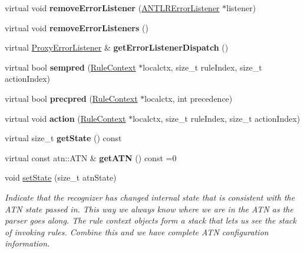 \begin{DoxyCompactItemize}
\mbox{\label{classantlr4_1_1Recognizer_a50b0c2e240269b77423c9a5594099702}} 
virtual void {\bfseries remove\+Error\+Listener} (\hyperlink{classantlr4_1_1ANTLRErrorListener}{A\+N\+T\+L\+R\+Error\+Listener} $\ast$listener)
\item 
\mbox{\label{classantlr4_1_1Recognizer_a797d1a5ae007a3b4cf34ce4cf9cf483d}} 
virtual void {\bfseries remove\+Error\+Listeners} ()
\item 
\mbox{\label{classantlr4_1_1Recognizer_addb30fc3ff50bd952f441db63363651b}} 
virtual \hyperlink{classantlr4_1_1ProxyErrorListener}{Proxy\+Error\+Listener} \& {\bfseries get\+Error\+Listener\+Dispatch} ()
\item 
\mbox{\label{classantlr4_1_1Recognizer_a880040c8ed8ece2f802ae253c0e6c739}} 
virtual bool {\bfseries sempred} (\hyperlink{classantlr4_1_1RuleContext}{Rule\+Context} $\ast$localctx, size\+\_\+t rule\+Index, size\+\_\+t action\+Index)
\item 
\mbox{\label{classantlr4_1_1Recognizer_a2c4d6465c4f032d3ad7ffda19dc48a8f}} 
virtual bool {\bfseries precpred} (\hyperlink{classantlr4_1_1RuleContext}{Rule\+Context} $\ast$localctx, int precedence)
\item 
\mbox{\label{classantlr4_1_1Recognizer_a4fab2ad8e24b7c49deba777cedefe4e4}} 
virtual void {\bfseries action} (\hyperlink{classantlr4_1_1RuleContext}{Rule\+Context} $\ast$localctx, size\+\_\+t rule\+Index, size\+\_\+t action\+Index)
\item 
\mbox{\label{classantlr4_1_1Recognizer_a04755e8c634599894ce85d1179a34431}} 
virtual size\+\_\+t {\bfseries get\+State} () const
\item 
\mbox{\label{classantlr4_1_1Recognizer_ab8ccbcdd2fe64abf436aafdb9d206d02}} 
virtual const atn\+::\+A\+TN \& {\bfseries get\+A\+TN} () const =0
\item 
void \hyperlink{classantlr4_1_1Recognizer_a01f30b45ab12a03262826e23382c8a89}{set\+State} (size\+\_\+t atn\+State)
\begin{DoxyCompactList}\small\item\em Indicate that the recognizer has changed internal state that is consistent with the A\+TN state passed in. This way we always know where we are in the A\+TN as the parser goes along. The rule context objects form a stack that lets us see the stack of invoking rules. Combine this and we have complete A\+TN configuration information. \end{DoxyCompactList}\item 

\end{DoxyCompactItemize}
